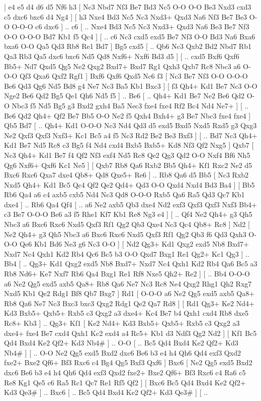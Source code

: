 \makegametitle 
|   e4   e5    d4   d6    d5   Nf6    h3 [  Nc3 Nbd7  Nf3 Be7  Bd3 Nc5  O-O O-O  Be3 Nxd3  cxd3 c5  dxc6 bxc6  d4 Ng4   ]  [  h3 Nxe4  Bd3 Nc5  Nc3 Nxd3+  Qxd3 Na6  Nf3 Be7  Be3 O-O  O-O-O c6  dxc6   ] .. c6 [ .. Nxe4  Bd3 Nc5  Nc3 Nxd3+  Qxd3 Na6  Be3 Be7  Nf3 O-O  O-O-O Bd7  Kb1 f5  Qc4   ]  [ .. c6  Nc3 cxd5  exd5 Be7  Nf3 O-O  Bd3 Na6  Bxa6 bxa6  O-O Qa5  Qd3 Rb8  Re1 Bd7   ]  Bg5   cxd5 [ .. Qb6  Nc3 Qxb2  Bd2 Nbd7  Rb1 Qa3  Rb3 Qa5  dxc6 bxc6  Nd5 Qd8  Nxf6+ Nxf6  Bd3 d5   ]  [ .. cxd5  Bxf6 Qxf6  Bb5+ Nd7  Qxd5 Qg5  Ne2 Qxg2  Bxd7+ Bxd7  Rg1 Qxh3  Qxb7 Rc8  Nbc3 a6  O-O-O Qf3  Qxa6 Qxf2  Rgf1   ]  Bxf6   Qxf6    Qxd5   Nc6    f3 [  Nc3 Be7  Nf3 O-O  O-O-O Be6  Qd3 Qg6  Nd5 Bd8  g4 Ne7  Nc3 Ba5  Kb1 Bxc3   ]  [  f3 Qh4+  Kd1 Be7  Nc3 O-O  Nge2 Be6  Qd2 Bg5  Qe1 Qh6  Nd5 f5   ] .. Be6 [ .. Qh4+  Kd1 Be7  Ne2 Be6  Qd2 O-O  Nbc3 f5  Nd5 Bg5  g3 Bxd2  gxh4 Ba5  Nec3 fxe4  fxe4 Rf2  Bc4 Nd4  Ne7+   ]  [ .. Be6  Qd2 Qh4+  Qf2 Be7  Bb5 O-O  Ne2 f5  Qxh4 Bxh4+  g3 Be7  Nbc3 fxe4  fxe4   ]  Qb5   Bd7 [ .. Qh4+  Kd1 O-O-O  Nc3 Nd4  Qd3 d5  exd5 Bxd5  Nxd5 Rxd5  g3 Qxg3  Ne2 Qxf3  Qxf3 Nxf3+  Kc1 Bc5  a4 f5  Nc3 Rd2  Be2 Be3  Bxf3   ]  [ .. Bd7  Nc3 Qh4+  Kd1 Be7  Nd5 Rc8  c3 Bg5  f4 Nd4  cxd4 Bxb5  Bxb5+ Kd8  Nf3 Qf2  Nxg5   ]  Qxb7 [  Nc3 Qh4+  Kd1 Be7  f4 Qf2  Nf3 exf4  Nd5 Rc8  Qe2 Qg3  Qd2 O-O  Nxf4 Bf6  Nh5 Qg6  Nxf6+ Qxf6  Kc1 Ne5   ]  [  Qxb7 Rb8  Qa6 Rxb2  Bb5 Qh4+  Kf1 Rxc2  Ne2 d5  Bxc6 Rxc6  Qxa7 dxe4  Qb8+ Qd8  Qxe5+ Re6   ] .. Rb8    Qa6   d5    Bb5 [  Nc3 Rxb2  Nxd5 Qh4+  Kd1 Bc5  Qc4 Qf2  Qe2 Qd4+  Qd3 O-O  Qxd4 Nxd4  Bd3 Ba4   ]  [  Bb5 Rb6  Qa4 a6  c4 axb5  cxb5 Nd4  Nc3 Qd8  O-O-O Rxb5  Qa6 Ra5  Qd3 Qc7  Kb1 dxe4   ] .. Rb6    Qa4   Qf4 [ .. a6  Ne2 axb5  Qb3 dxe4  Nd2 exf3  Qxf3 Qxf3  Nxf3 Bb4+  c3 Be7  O-O-O Be6  a3 f5  Rhe1 Kf7  Kb1 Re8  Ng3 e4   ]  [ .. Qf4  Ne2 Qh4+  g3 Qh5  Nbc3 a6  Bxc6 Rxc6  Nxd5 Qxf3  Rf1 Qg2  Qb3 Qxe4  Nc3 Qc4  Qb8+ Rc8   ]  Nd2 [  Ne2 Qh4+  g3 Qh5  Nbc3 a6  Bxc6 Rxc6  Nxd5 Qxf3  Rf1 Qg2  Qb3 f6  Qd3 Qxh3  O-O-O Qe6  Kb1 Bd6  Ne3 g6  Nc3 O-O   ]  [  Nd2 Qg3+  Kd1 Qxg2  exd5 Nb8  Bxd7+ Nxd7  Nc4 Qxh1  Kd2 Rb4  Qc6 Bc5  b3 O-O  Qxd7 Bxg1  Re1 Qg2+  Kc1 Qg3   ] .. Bb4 [ .. Qg3+  Kd1 Qxg2  exd5 Nb8  Bxd7+ Nxd7  Nc4 Qxh1  Kd2 Rb4  Qa6 Bc5  a3 Rb8  Nd6+ Ke7  Nxf7 Rb6  Qa4 Bxg1  Re1 Rf8  Nxe5 Qh2+  Re2   ]  [ .. Bb4  O-O-O a6  Ne2 Qg5  exd5 axb5  Qa8+ Rb8  Qa6 Ne7  Nc3 Rc8  Ne4 Qxg2  Rhg1 Qh2  Rxg7 Nxd5  Kb1 Qe2  Rdg1 Bf8  Qb7 Bxg7   ]  Rd1 [  O-O-O a6  Ne2 Qg5  exd5 axb5  Qa8+ Rb8  Qa6 Ne7  Nc3 Bxc3  bxc3 Qxg2  Rdg1 Qe2  Qa7 Rd8   ]  [  Rd1 Qg3+  Ke2 Nd4+  Kd3 Bxb5+  Qxb5+ Rxb5  c3 Qxg2  a3 dxe4+  Kc4 Be7  b4 Qxh1  cxd4 Rb8  dxe5 Rc8+  Kb3   ] .. Qg3+    Kf1 [  Ke2 Nd4+  Kd3 Bxb5+  Qxb5+ Rxb5  c3 Qxg2  a3 dxe4+  fxe4 Be7  cxd4 Qxh1  Kc2 exd4  a4 Rc5+  Kb1 d3  Ndf3 Qg2  Nd2   ]  [  Kf1 Bc5  Qd4 Bxd4  Ke2 Qf2+  Kd3 Nb4#   ] .. O-O [ .. Bc5  Qd4 Bxd4  Ke2 Qf2+  Kd3 Nb4#   ]  [ .. O-O  Ne2 Qg5  exd5 Bxd2  dxc6 Be6  b3 e4  h4 Qh6  Qd4 exf3  Qxd2 fxe2+  Bxe2 Qf6+  Bf3 Rxc6  c4 Bg4  Qg5 Bxf3  Qxf6   ]  Bxc6 [  Ne2 Qg5  exd5 Bxd2  dxc6 Be6  b3 e4  h4 Qh6  Qd4 exf3  Qxd2 fxe2+  Bxe2 Qf6+  Bf3 Rxc6  c4 Ra6  c5 Re8  Kg1 Qe5  c6 Ra5  Rc1 Qc7  Re1 Rf5  Qf2   ]  [  Bxc6 Bc5  Qd4 Bxd4  Ke2 Qf2+  Kd3 Qe3#   ] .. Bxc6 [ .. Bc5  Qd4 Bxd4  Ke2 Qf2+  Kd3 Qe3#   ]  [ .. 